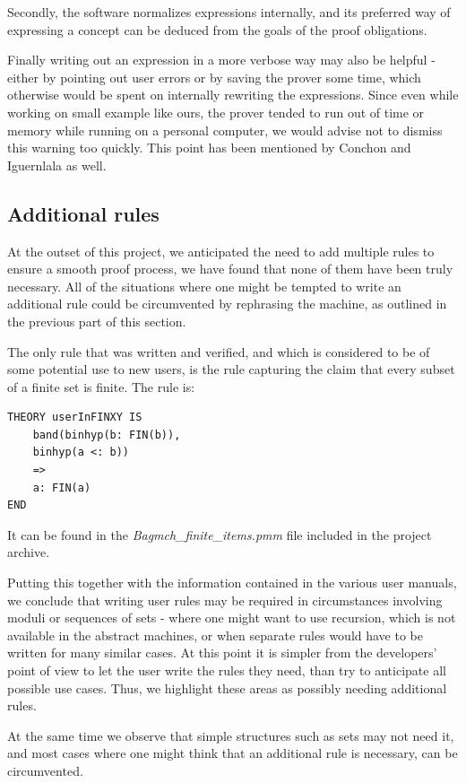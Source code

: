 \documentclass[12pt,journal,duplex]{IEEEtran}
\begin{document}
	Secondly, the software normalizes expressions internally, and its preferred way of expressing a concept can be deduced from the goals of the proof obligations.

	Finally writing out an expression in a more verbose way may also be helpful - either by pointing out user errors or by saving the prover some time, which otherwise would be spent on internally rewriting the expressions. Since even while working on small example like ours, the prover tended to run out of time or memory while running on a personal computer, we would advise not to dismiss this warning too quickly. This point has been mentioned by Conchon and Iguernlala as well\cite{San Juan metro}.

	\subsection{Additional rules}
	At the outset of this project, we anticipated the need to add multiple rules to ensure a smooth proof process, we have found that none of them have been truly necessary. All of the situations where one might be tempted to write an additional rule could be circumvented by rephrasing the machine, as outlined in the previous part of this section.

	The only rule that was written and verified, and which is considered to be of some potential use to new users, is the rule capturing the claim that every subset of a finite set is finite. The rule is:
	\begin{lstlisting}
THEORY userInFINXY IS
	band(binhyp(b: FIN(b)),
	binhyp(a <: b))
	=>
	a: FIN(a)
END
	\end{lstlisting}
	It can be found in the \emph{Bagmch\_finite\_items.pmm} file included in the project archive.

	Putting this together with the information contained in the various user manuals, we conclude that writing user rules may be required in circumstances involving moduli or sequences of sets - where one might want to use recursion, which is not available in the abstract machines, or when separate rules would have to be written for many similar cases. At this point it is simpler from the developers' point of view to let the user write the rules they need, than try to anticipate all possible use cases. Thus, we highlight these areas as possibly needing additional rules.

	At the same time we observe that simple structures such as sets may not need it, and most cases where one might think that an additional rule is necessary, can be circumvented.
\end{document}
